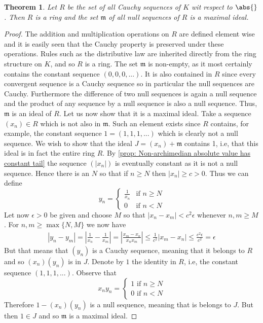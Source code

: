 \documentclass{article}
\newtheorem{theorem}{Theorem}[section]
\newcommand{\mfrak}[1]{\mathfrak{#1}}
\numberwithin{equation}{section}
\begin{document}
\begin{theorem}\label{thm: Null sequences is maximal ideal}
	Let $R$ be the set of all Cauchy sequences of $K$ wit respect to $\abs{}$. Then $R$ is a ring and the set $\mfrak m$ of all null sequences of $R$ is a maximal ideal.
\end{theorem}
\begin{proof}
	The addition and multiplication operations on $R$ are defined element wise and it is easily seen that the Cauchy property is preserved under these operations. Rules such as the distributive law are inherited directly from the ring structure on $K$, and so $R$ is a ring. The set $\mfrak m$ is non-empty, as it most certainly contains the constant sequence $(0,0,0,...)$. It is also contained in $R$ since every convergent sequence is a Cauchy sequence so in particular the null sequences are Cauchy. Furthermore the difference of two null sequences is again a null sequence and the product of any sequence by a null sequence is also a null sequence. Thus, $\mfrak m$ is an ideal of $R$. Let us now show that it is a maximal ideal. Take a sequence $(x_n) \in R$ which is not also in $\mfrak m$. Such an element exists since $R$ contains, for example, the constant sequence $1 = (1,1,1, ...)$ which is clearly not a null sequence. We wish to show that the ideal $J = (x_n) + \mfrak m$ contains 1, i.e, that this ideal is in fact the entire ring $R$. By \cref{prop: Non-archimedian absolute value has constant tail} the sequence $(|x_n|)$ is eventually constant as it is not a null sequence. Hence there is an $N$ so that if $n \geq N$ then $|x_n| \geq c > 0$. Thus we can define
	$$y_n = \begin{cases} \frac{1}{x_n} & \text{if } n \geq N \\ 0 & \text{if } n < N \end{cases}$$
	Let now $\epsilon > 0$ be given and choose $M$ so that $|x_n - x_m| < c^2 \epsilon$ whenever $n,m \geq M$. For $n,m \geq \max\{N,M\}$ we now have
	\begin{align*}
    	|y_n - y_m| = |\frac{1}{x_n} - \frac{1}{x_m}| = |\frac{x_m - x_n}{x_n x_m}| \leq \frac{1}{c^2} |x_m - x_n| \leq \frac{c^2 \epsilon}{c^2} = \epsilon
	\end{align*}
	But that means that $(y_n)$ is a Cauchy sequence, meaning that it belongs to $R$ and so $(x_n)(y_n)$ is in $J$. Denote by $1$ the identity in $R$, i.e, the constant sequence $(1,1,1, ...)$. Observe that
	$$x_ny_n = \begin{cases}
    	1 \text{ if } n \geq N \\
    	0 \text{ if } n < N
	\end{cases}$$
	Therefore $1 - (x_n) (y_n)$ is a null sequence, meaning that is belongs to $J$. But then $1 \in J$ and so $\mfrak m$ is a maximal ideal.
\end{proof}
\end{document}
